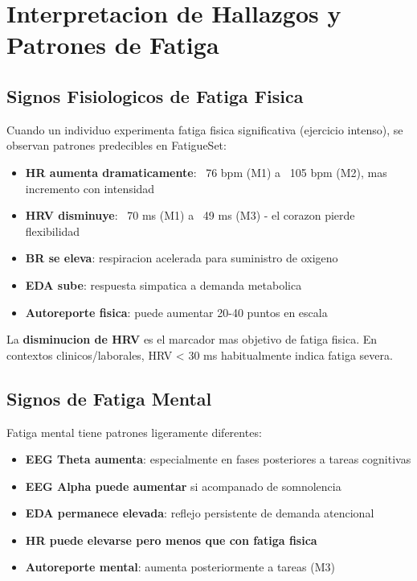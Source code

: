 \chapter{Interpretacion de Hallazgos y Patrones de Fatiga}
\label{cap:interpretation}

\section{Signos Fisiologicos de Fatiga Fisica}

Cuando un individuo experimenta fatiga fisica significativa (ejercicio intenso),
se observan patrones predecibles en FatigueSet:

\begin{itemize}
    \item \textbf{HR aumenta dramaticamente}: ~76 bpm (M1) a ~105 bpm (M2), mas incremento con intensidad
    \item \textbf{HRV disminuye}: ~70 ms (M1) a ~49 ms (M3) - el corazon pierde flexibilidad
    \item \textbf{BR se eleva}: respiracion acelerada para suministro de oxigeno
    \item \textbf{EDA sube}: respuesta simpatica a demanda metabolica
    \item \textbf{Autoreporte fisica}: puede aumentar 20-40 puntos en escala
\end{itemize}

La \textbf{disminucion de HRV} es el marcador mas objetivo de fatiga fisica.
En contextos clinicos/laborales, HRV < 30 ms habitualmente indica fatiga severa.

\section{Signos de Fatiga Mental}

Fatiga mental tiene patrones ligeramente diferentes:

\begin{itemize}
    \item \textbf{EEG Theta aumenta}: especialmente en fases posteriores a tareas cognitivas
    \item \textbf{EEG Alpha puede aumentar} si acompanado de somnolencia
    \item \textbf{EDA permanece elevada}: reflejo persistente de demanda atencional
    \item \textbf{HR puede elevarse pero menos que con fatiga fisica}
    \item \textbf{Autoreporte mental}: aumenta posteriormente a tareas (M3)
\end{itemize}

